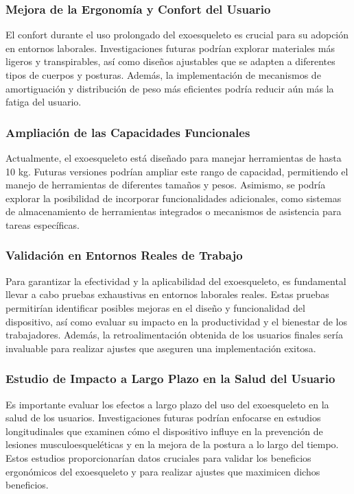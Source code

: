 \subsubsection{Mejora de la Ergonomía y Confort del Usuario}
El confort durante el uso prolongado del exoesqueleto es crucial para su adopción en entornos laborales. Investigaciones futuras podrían explorar materiales más ligeros y transpirables, así como diseños ajustables que se adapten a diferentes tipos de cuerpos y posturas. Además, la implementación de mecanismos de amortiguación y distribución de peso más eficientes podría reducir aún más la fatiga del usuario.

\subsubsection{Ampliación de las Capacidades Funcionales}
Actualmente, el exoesqueleto está diseñado para manejar herramientas de hasta 10 kg. Futuras versiones podrían ampliar este rango de capacidad, permitiendo el manejo de herramientas de diferentes tamaños y pesos. Asimismo, se podría explorar la posibilidad de incorporar funcionalidades adicionales, como sistemas de almacenamiento de herramientas integrados o mecanismos de asistencia para tareas específicas.

\subsubsection{Validación en Entornos Reales de Trabajo}
Para garantizar la efectividad y la aplicabilidad del exoesqueleto, es fundamental llevar a cabo pruebas exhaustivas en entornos laborales reales. Estas pruebas permitirían identificar posibles mejoras en el diseño y funcionalidad del dispositivo, así como evaluar su impacto en la productividad y el bienestar de los trabajadores. Además, la retroalimentación obtenida de los usuarios finales sería invaluable para realizar ajustes que aseguren una implementación exitosa.

\subsubsection{Estudio de Impacto a Largo Plazo en la Salud del Usuario}
Es importante evaluar los efectos a largo plazo del uso del exoesqueleto en la salud de los usuarios. Investigaciones futuras podrían enfocarse en estudios longitudinales que examinen cómo el dispositivo influye en la prevención de lesiones musculoesqueléticas y en la mejora de la postura a lo largo del tiempo. Estos estudios proporcionarían datos cruciales para validar los beneficios ergonómicos del exoesqueleto y para realizar ajustes que maximicen dichos beneficios.

